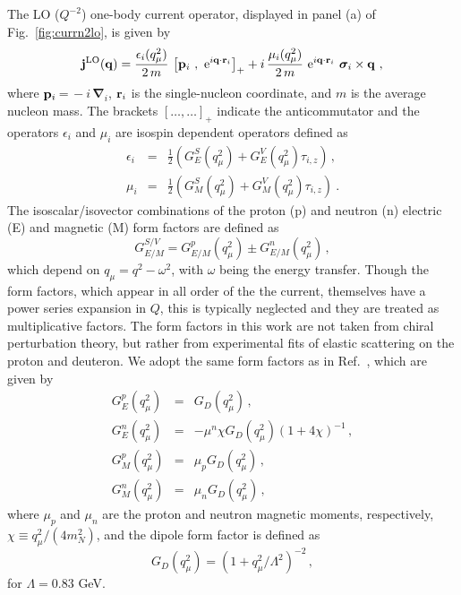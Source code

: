 \documentclass[aps,prc,floatfix,showpacs,twocolumn, preprintnumbers]{revtex4-2}
\begin{document}
The LO ($Q^{-2}$) one-body current operator, displayed in panel (a) of Fig.~\ref{fig:currn2lo}, is given by
\begin{equation}
\label{eq:jlo}
{\bf j}^{\rm LO}({\bf q})=\frac{\epsilon_i(q_{\mu}^2) }{2\, m}\,
 \left[{\bf p}_i\,\, ,\, \, {\rm e}^{i{\bf q}\cdot{\bf r}_i}  \right]_+ 
+i\,\frac{\mu_{i}(q_{\mu}^2) }{2\, m} \,\, {\rm e}^{i{\bf q}\cdot{\bf r}_i}\,\, {\bm \sigma}_i\times {\bf q }\ ,
 \end{equation}
where ${\bf p}_i\,$=$\, -i\, {\bm \nabla}_i$, ${\bf r}_i$ is the single-nucleon coordinate,  and $m$ is the average nucleon mass. The brackets $[ \ldots,\ldots]_{+}$ indicate the anticommutator and the operators $\epsilon_i$ and $\mu_i$ are isospin dependent operators defined as
\begin{eqnarray}
\epsilon_i&=& \frac{1}{2}\left(G^S_E(q_{\mu}^2)+G^V_E(q_{\mu}^2)\tau_{i,z}\right) \, , \\
\mu_i &=& \frac{1}{2}\left(G^S_M(q_{\mu}^2)+G^V_M(q_{\mu}^2)\tau_{i,z}\right) \ .
\end{eqnarray}
The isoscalar/isovector combinations of the proton (p) and neutron (n) electric (E) and magnetic (M) form factors are defined as
\begin{equation}
G^{S/V}_{E/M} = G^p_{E/M}(q_{\mu}^2) \pm G^n_{E/M}(q_{\mu}^2) \, ,  
\end{equation}
which depend on $q_{\mu} = q^2 - \omega^2$, with $\omega$ being the energy transfer. Though the form factors, which appear in all order of the the current, themselves have a power series expansion in $Q$, this is typically neglected and they are treated as multiplicative factors. The form factors in this work are not taken from chiral perturbation theory, but rather from experimental fits of elastic scattering on the proton and deuteron. We adopt the same form factors as in Ref.~\cite{Gnech:2022vwr}, which are given by
\begin{eqnarray*}
G_E^p(q_{\mu}^2) &=& G_D(q_{\mu}^2)\, ,\\
G_E^n(q_{\mu}^2) &=& -\mu^n \chi G_D(q_{\mu}^2) (1 + 4\chi)^{-1} \, ,\\
G_M^p(q_{\mu}^2) &=& \mu_p G_D(q_{\mu}^2)\, , \\
G_M^n(q_{\mu}^2) &=& \mu_n G_D(q_{\mu}^2)\, ,
\end{eqnarray*}
where $\mu_p$ and $\mu_n$ are the proton and neutron magnetic moments, respectively, $\chi \equiv q_{\mu}^2/(4m_N^2)$, and the dipole form factor is defined as
\begin{equation}
G_D(q_{\mu}^2) = (1 + q_{\mu}^2/\Lambda^2)^{-2}\, ,    
\end{equation}
for $\Lambda = 0.83$ GeV.
\end{document}
